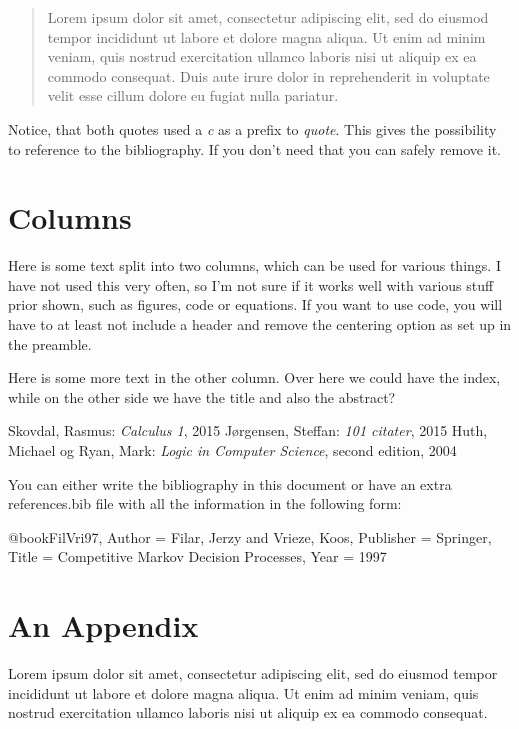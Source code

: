 \documentclass[a4, english]{article}
\begin{document}
\blockcquote[s. 1]{berlog}{Lorem ipsum dolor sit amet, consectetur adipiscing elit, sed do eiusmod tempor incididunt ut labore et dolore magna aliqua. Ut enim ad minim veniam, quis nostrud exercitation ullamco laboris nisi ut aliquip ex ea commodo consequat. Duis aute irure dolor in reprehenderit in voluptate velit esse cillum dolore eu fugiat nulla pariatur.}

Notice, that both quotes used a \emph{c} as a prefix to \emph{quote}. This gives the possibility to reference to the bibliography. If you don't need that you can safely remove it.

\section{Columns}
\begin{multicols}{2}

\noindent Here is some text split into two columns, which can be used for various things. I have not used this very often, so I'm not sure if it works well with various stuff prior shown, such as figures, code or equations. If you want to use code, you will have to at least not include a header and remove the centering option as set up in the preamble.

\vfill \columnbreak

Here is some more text in the other column. Over here we could have the index, while on the other side we have the title and also the abstract?

\end{multicols}

\begin{thebibliography}{9}
	Skovdal, Rasmus: \emph{Calculus 1}, 2015
	Jørgensen, Steffan: \emph{101 citater}, 2015
	Huth, Michael og Ryan, Mark: \emph{Logic in Computer Science}, second edition, 2004

 You can either write the bibliography in this document or have an extra references.bib file with all the information in the following form:
 
@book{FilVri97,
Author = {Filar, Jerzy and Vrieze, Koos},
Publisher = {Springer},
Title = {Competitive Markov Decision Processes},
Year = 1997
} 
 
\end{thebibliography}



\newpage
\appendix
\section{An Appendix}
Lorem ipsum dolor sit amet, consectetur adipiscing elit, sed do eiusmod tempor incididunt ut labore et dolore magna aliqua. Ut enim ad minim veniam, quis nostrud exercitation ullamco laboris nisi ut aliquip ex ea commodo consequat.
\end{document}
